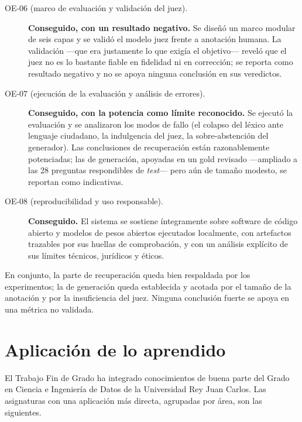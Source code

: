 \begin{description}
  \item[OE-06 (marco de evaluación y validación del juez).] \textbf{Conseguido, con un resultado negativo.} Se diseñó un marco modular de seis capas y se validó el modelo juez frente a anotación humana. La validación —que era justamente lo que exigía el objetivo— reveló que el juez no es lo bastante fiable en fidelidad ni en corrección; se reporta como resultado negativo y no se apoya ninguna conclusión en sus veredictos.

  \item[OE-07 (ejecución de la evaluación y análisis de errores).] \textbf{Conseguido, con la potencia como límite reconocido.} Se ejecutó la evaluación y se analizaron los modos de fallo (el colapso del léxico ante lenguaje ciudadano, la indulgencia del juez, la sobre-abstención del generador). Las conclusiones de recuperación están razonablemente potenciadas; las de generación, apoyadas en un gold revisado —ampliado a las 28 preguntas respondibles de \emph{test}— pero aún de tamaño modesto, se reportan como indicativas.

  \item[OE-08 (reproducibilidad y uso responsable).] \textbf{Conseguido.} El sistema se sostiene íntegramente sobre software de código abierto y modelos de pesos abiertos ejecutados localmente, con artefactos trazables por sus huellas de comprobación, y con un análisis explícito de sus límites técnicos, jurídicos y éticos.
\end{description}

En conjunto, la parte de recuperación queda bien respaldada por los experimentos; la de generación queda establecida y acotada por el tamaño de la anotación y por la insuficiencia del juez. Ninguna conclusión fuerte se apoya en una métrica no validada.

\section{Aplicación de lo aprendido}
\label{sec:aplicacion}

El Trabajo Fin de Grado ha integrado conocimientos de buena parte del Grado en Ciencia e Ingeniería de Datos de la Universidad Rey Juan Carlos. Las asignaturas con una aplicación más directa, agrupadas por área, son las siguientes.

